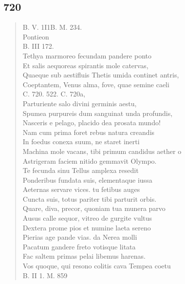 \documentclass[11pt, a4paper]{report}
\begin{document}
            \subsection*{720}
      \begin{verse}
      B. V. 1I1B. M. 234. \\ Pontieon \\ B. III 172. \\ Tethya marmoreo fecundam pandere ponto \\ Et salis aequoreas spirantis mole catervas, \\ Quaeque sub aestifluis Thetis umida continet antris, \\ Coeptantem, Venus alma, fove, quae semine caeli \\ 
        ﻿\pagebreak 
    C. 720. 522. C. 720a, \\ Parturiente salo divini germinis aestu, \\ Spumea purpureis dum sanguinat unda profundis, \\ Nasceris e pelago, placido dea prosata mundo! \\ Nam cum prima foret rebus natura creandis \\ In foedus conexa suum, ne staret inerti \\ Machina mole vacans, tibi primum candidus aether o \\ Astrigeram faciem nitido gemmavit Olympo. \\ Te fecunda sinu Tellus amplexa resedit \\ Ponderibus fundata suis, elementaque iussa \\ Aeternas servare vices. tu fetibus auges \\ Cuncta suis, totus pariter tibi parturit orbis. \\ Quare, diva, precor, quoniam tua munera parvo \\ Ausus calle sequor, vitreo de gurgite vultus \\ Dextera prome pios et numine laeta sereno \\ Pierias age pande vias. da Nerea molli \\ Pacatum gandere freto votisque litata \\ Fac saltem primas pelai libemus harenas. \\ Vos quoque, qui resono colitis cava Tempea coetu \\ B. II 1. M. 859 \\ 
      \end{verse}
  
\end{document}
